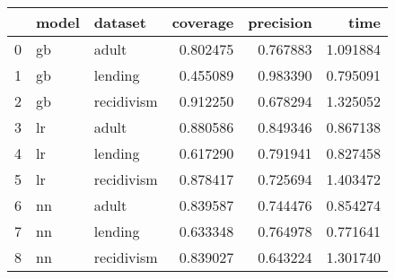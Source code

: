 \begin{tabular}{lllrrr}
\toprule
 & model & dataset & coverage & precision & time \\
\midrule
0 & gb & adult & 0.802475 & 0.767883 & 1.091884 \\
\cline{1-1}
1 & gb & lending & 0.455089 & 0.983390 & 0.795091 \\
\cline{1-1}
2 & gb & recidivism & 0.912250 & 0.678294 & 1.325052 \\
\cline{1-1}
3 & lr & adult & 0.880586 & 0.849346 & 0.867138 \\
\cline{1-1}
4 & lr & lending & 0.617290 & 0.791941 & 0.827458 \\
\cline{1-1}
5 & lr & recidivism & 0.878417 & 0.725694 & 1.403472 \\
\cline{1-1}
6 & nn & adult & 0.839587 & 0.744476 & 0.854274 \\
\cline{1-1}
7 & nn & lending & 0.633348 & 0.764978 & 0.771641 \\
\cline{1-1}
8 & nn & recidivism & 0.839027 & 0.643224 & 1.301740 \\
\cline{1-1}
\bottomrule
\end{tabular}
